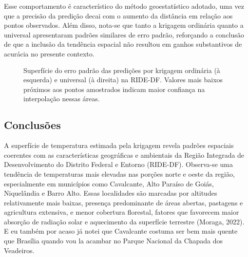 \documentclass[
  letterpaper,
  DIV=11,
  numbers=noendperiod]{scrartcl}
\begin{document}
Esse comportamento é característico do método geoestatístico adotado,
uma vez que a precisão da predição decai com o aumento da distância em
relação aos pontos observados. Além disso, nota-se que tanto a krigagem
ordinária quanto a universal apresentaram padrões similares de erro
padrão, reforçando a conclusão de que a inclusão da tendência espacial
não resultou em ganhos substantivos de acurácia no presente contexto.

\label{cell-fig-superficie-erro-padrao}
\begin{figure}[H]


\caption{\label{fig-superficie-erro-padrao}Superfície do erro padrão das
predições por krigagem ordinária (à esquerda) e universal (à direita) na
RIDE-DF. Valores mais baixos próximos aos pontos amostrados indicam
maior confiança na interpolação nessas áreas.}

\end{figure}%

\subsection{Conclusões}\label{conclusuxf5es}

A superfície de temperatura estimada pela krigagem revela padrões
espaciais coerentes com as características geográficas e ambientais da
Região Integrada de Desenvolvimento do Distrito Federal e Entorno
(RIDE-DF). Observa-se uma tendência de temperaturas mais elevadas nas
porções norte e oeste da região, especialmente em municípios como
Cavalcante, Alto Paraíso de Goiás, Niquelândia e Barro Alto. Essas
localidades são marcadas por altitudes relativamente mais baixas,
presença predominante de áreas abertas, pastagens e agricultura
extensiva, e menor cobertura florestal, fatores que favorecem maior
absorção de radiação solar e aquecimento da superfície terrestre
(Moraga, 2022). E eu também por acaso já notei que Cavalcante costuma
ser bem mais quente que Brasília quando vou la acambar no Parque
Nacional da Chapada dos Veadeiros.
\end{document}
